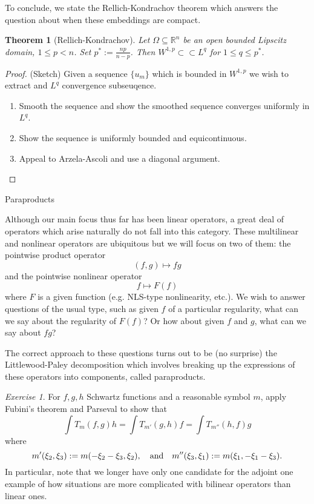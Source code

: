 \documentclass[11pt]{article}
\newtheorem{thm}{Theorem}
\theoremstyle{remark}
\newtheorem{exr}{Exercise}
\newcommand{\1}{\textbf{1}}
\newcommand{\bbR}{\mathbb{R}}
\begin{document}
To conclude, we state the Rellich-Kondrachov theorem which answers the question about when these embeddings are compact.
\begin{thm}[Rellich-Kondrachov]
Let $\Omega \subseteq \bbR^n$ be an open bounded Lipscitz domain, $1 \leq p < n$. Set
$ p^* := \frac{np}{n-p}$. Then $W^{1,p} \subset\subset L^q$ for $1 \leq q \leq p^*$.
\end{thm}
\begin{proof}(Sketch)
Given a sequence $\{u_m\}$ which is bounded in $W^{1,p}$ we wish to extract and $L^q$ convergence subseuqence.
\begin{enumerate}
\item Smooth the sequence and show the smoothed sequence converges uniformly in $L^q$.
\item Show the sequence is uniformly bounded and equicontinuous.
\item Appeal to Arzela-Ascoli and use a diagonal argument.
\end{enumerate}
\end{proof}
\newpage
{\noindent\Large Paraproducts}
\vspace{6mm}

Although our main focus thus far has been linear operators, a great deal of operators which arise naturally do not fall into this category. These multilinear and nonlinear operators are ubiquitous but we will focus on two of them: the pointwise product operator
\[
(f,g) \mapsto fg
\]
and the pointwise nonlinear operator
\[
f \mapsto F(f)
\]
where $F$ is a given function (e.g. NLS-type nonlinearity, etc.). We wish to answer questions of the usual type, such as given $f$ of a particular regularity, what can we say about the regularity of $F(f)$? Or how about given $f$ and $g$, what can we say about $fg$?

The correct approach to these questions turns out to be (no surprise) the Littlewood-Paley decomposition which involves breaking up the expressions of these operators into components, called paraproducts.

\begin{exr}
For $f,g, h$ Schwartz functions and a reasonable symbol $m$, apply Fubini's theorem and Parseval to show that
\[
\int T_m(f,g) h = \int T_{m'}(g,h) f = \int T_{m''}(h,f) g
\]
where
\[
m'(\xi_2,\xi_3) := m(-\xi_2-\xi_3, \xi_2), \quad\textup{and} \quad m''(\xi_3, \xi_1) := m(\xi_1, - \xi_1 - \xi_3).
\]
In particular, note that we longer have only one candidate for the adjoint one example of how situations are more complicated with bilinear operators than linear ones.
\end{exr}
\end{document}
